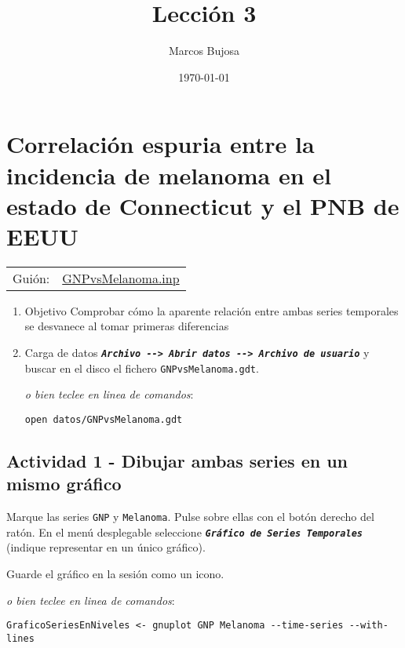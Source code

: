 \documentclass[11pt]{article}
\author{Marcos Bujosa}
\date{\today}
\title{Lección 3}
\begin{document}
\maketitle
\tableofcontents



\section{Correlación espuria entre la incidencia de melanoma en el estado de Connecticut y el PNB de EEUU}
\label{sec:org862f110}
\begin{center}
\begin{tabular}{ll}
Guión: & \href{https://github.com/mbujosab/Ectr/tree/master/Practicas/Gretl/scripts/GNPvsMelanoma.inp}{GNPvsMelanoma.inp}\\[0pt]
\end{tabular}
\end{center}

\begin{enumerate}
\item Objetivo
\label{sec:orge63afff}
Comprobar cómo la aparente relación entre ambas series temporales se
desvanece al tomar primeras diferencias

\item Carga de datos
\label{sec:org7bcc780}
\textbf{\emph{\texttt{Archivo -{}-{}> Abrir datos -{}-{}> Archivo de usuario}}} y buscar en el
disco el fichero \texttt{GNPvsMelanoma.gdt}.

{\vspace{0pt} \footnotesize \color{gray!70!black}
\emph{o bien teclee en linea de comandos}:
\begin{verbatim}
open datos/GNPvsMelanoma.gdt
\end{verbatim}
}
\end{enumerate}

\subsection{Actividad 1 - Dibujar ambas series en un mismo gráfico}
\label{sec:orgd7841f6}
Marque las series \texttt{GNP} y \texttt{Melanoma}. Pulse sobre ellas con el botón
derecho del ratón. En el menú desplegable seleccione \textbf{\emph{\texttt{Gráfico de
Series Temporales}}} (indique representar en un único gráfico).

Guarde el gráfico en la sesión como un icono.

{\vspace{1pt} \footnotesize \color{gray!70!black}
\emph{o bien teclee en linea de comandos}:
\begin{verbatim}
GraficoSeriesEnNiveles <- gnuplot GNP Melanoma --time-series --with-lines
\end{verbatim}
}
\end{document}
